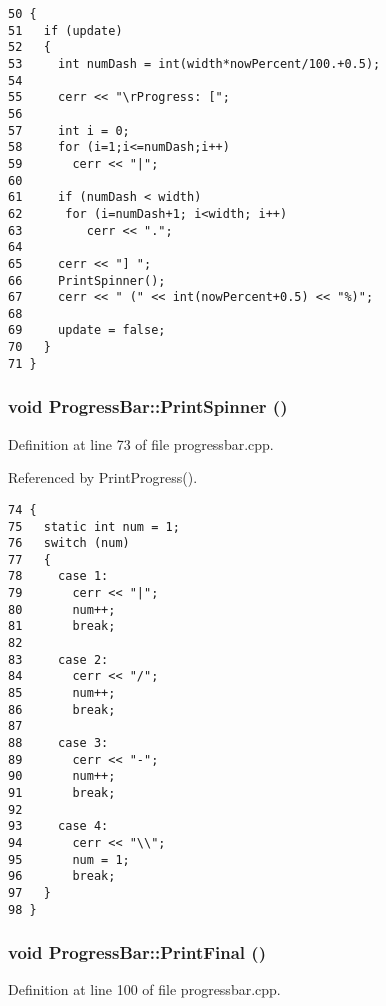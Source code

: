 \begin{Code}\begin{verbatim}50 {
51   if (update)
52   {  
53     int numDash = int(width*nowPercent/100.+0.5);
54   
55     cerr << "\rProgress: [";
56     
57     int i = 0;
58     for (i=1;i<=numDash;i++)
59       cerr << "|";
60   
61     if (numDash < width)
62      for (i=numDash+1; i<width; i++)
63         cerr << ".";
64   
65     cerr << "] ";
66     PrintSpinner();
67     cerr << " (" << int(nowPercent+0.5) << "%)";
68   
69     update = false;
70   }
71 }
\end{verbatim}
\end{Code}


\subsubsection{\setlength{\rightskip}{0pt plus 5cm}void ProgressBar::PrintSpinner ()}\label{classProgressBar_728e5c2abda4c45938032e399a62f9ee}




Definition at line 73 of file progressbar.cpp.

Referenced by PrintProgress().

\begin{Code}\begin{verbatim}74 {
75   static int num = 1;
76   switch (num)
77   {
78     case 1:
79       cerr << "|";
80       num++;
81       break;
82       
83     case 2:
84       cerr << "/";
85       num++;
86       break;
87       
88     case 3:
89       cerr << "-";
90       num++;
91       break;
92       
93     case 4:
94       cerr << "\\";
95       num = 1;
96       break;
97   }
98 }
\end{verbatim}
\end{Code}


\subsubsection{\setlength{\rightskip}{0pt plus 5cm}void ProgressBar::PrintFinal ()}\label{classProgressBar_5029c2f271c6d928da3d0146246b9847}




Definition at line 100 of file progressbar.cpp.

